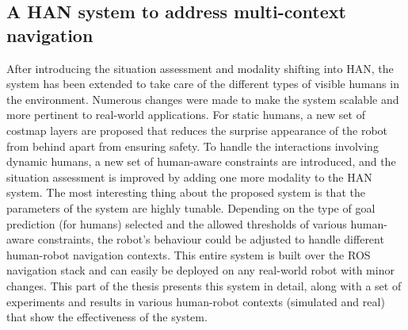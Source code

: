 \subsection*{A HAN system to address multi-context navigation}

After introducing the situation assessment and modality shifting into HAN, the system has been extended to take care of the different types of visible humans in the environment. Numerous changes were made to make the system scalable and more pertinent to real-world applications. For static humans, a new set of costmap layers are proposed that reduces the surprise appearance of the robot from behind apart from ensuring safety. To handle the interactions involving dynamic humans, a new set of human-aware constraints are introduced, and the situation assessment is improved by adding one more modality to the HAN system. The most interesting thing about the proposed system is that the parameters of the system are highly tunable. Depending on the type of goal prediction (for humans) selected and the allowed thresholds of various human-aware constraints, the robot's behaviour could be adjusted to handle different human-robot navigation contexts. This entire system is built over the ROS navigation stack and can easily be deployed on any real-world robot with minor changes. This part of the thesis presents this system in detail, along with a set of experiments and results in various human-robot contexts (simulated and real) that show the effectiveness of the system.


